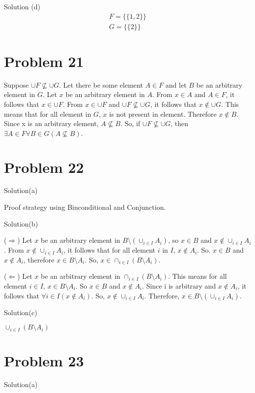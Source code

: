 \documentclass{article}
\begin{document}
Solution (d)
\begin{align*}
F = \{\{1,2\}\} \\
G = \{\{2\}\}  
\end{align*}

\section{Problem 21}

Suppose $\cup F \nsubseteq \cup G$. Let there be some element $A \in
F$ and let $B$ be an arbitrary element in $G$. Let $x$ be an arbitrary
element in $A$. From $x \in A$ and $A \in F$, it follows that $x \in
\cup F$. From $x \in \cup F$ and $\cup F \nsubseteq \cup G$, it
follows that $x \notin \cup G$. This means that for all element in
$G$, $x$ is not present in element. Therefore $x \notin B$. Since x is
an arbitrary element, $A \nsubseteq B$. So, if $\cup F \nsubseteq \cup
G$, then $\exists A \in F \forall B \in G (A \nsubseteq B)$.

\section{Problem 22}

Solution(a)

Proof strategy using Binconditional and Conjunction.

Solution(b)

($\Rightarrow$) Let $x$ be an arbitrary element in $B \setminus
(\cup_{i \in I} A_i)$, so $x \in B$ and $x \notin \cup_{i \in I}A_i$.
From $x \notin \cup_{i \in I}A_i$, it follows that for all element $i$
in $I$, $x \notin A_i$. So. $x \in B$ and $x \notin A_i$, therefore $x
\in B \setminus A_i$. So, $ x \in \cap_{i \in I}(B \setminus A_i)$.

($\Leftarrow$) Let $x$ be an arbitrary element in $\cap_{i \in I}(B
\setminus A_i)$. This means for all element $i \in I$, $x \in B
\setminus A_i$. So $x \in B$ and $x \notin A_i$. Since i is arbitrary
and $x \notin A_i$, it follows that $\forall i \in I(x \notin A_i)$.
So, $x \notin \cup_{i \in I}A_i$. Therefore, $x \in B \setminus
(\cup_{i \in I}A_i)$.

Solution(c)

$\cup_{i \in I}(B \setminus A_i)$

\section{Problem 23}

Solution(a)
\end{document}
